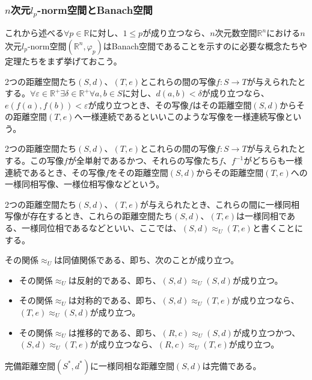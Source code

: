 \documentclass[dvipdfmx]{jsarticle}
\begin{document}
\subsubsection{$n$次元$l_{p}$-norm空間とBanach空間}%
これから述べる$\forall p \in \mathbb{R}$に対し、$1 \leq p$が成り立つなら、$n$次元数空間$\mathbb{R}^{n}$における$n$次元$l_{p}$-norm空間$\left( \mathbb{R}^{n},\varphi_{p} \right)$はBanach空間であることを示すのに必要な概念たちや定理たちをまず挙げておこう。
\begin{dfn}[一様連続写像]
2つの距離空間たち$(S,d)$、$(T,e)$とこれらの間の写像$f:S \rightarrow T$が与えられたとする。$\forall\varepsilon \in \mathbb{R}^{+}\exists\delta \in \mathbb{R}^{+}\forall a,b \in S$に対し、$d(a,b) < \delta$が成り立つなら、$e\left( f(a),f(b) \right) < \varepsilon$が成り立つとき、その写像$f$はその距離空間$(S,d)$からその距離空間$(T,e)$へ一様連続であるといいこのような写像を一様連続写像という。
\end{dfn}
\begin{dfn}[一様同相写像]
2つの距離空間たち$(S,d)$、$(T,e)$とこれらの間の写像$f:S \rightarrow T$が与えられたとする。この写像$f$が全単射であるかつ、それらの写像たち$f$、$f^{- 1}$がどちらも一様連続であるとき、その写像$f$をその距離空間$(S,d)$からその距離空間$(T,e)$への一様同相写像、一様位相写像などという。
\end{dfn}
\begin{dfn}[一様同相]
2つの距離空間たち$(S,d)$、$(T,e)$が与えられたとき、これらの間に一様同相写像が存在するとき、これらの距離空間たち$(S,d)$、$(T,e)$は一様同相である、一様同位相であるなどといい、ここでは、$(S,d) \approx_{U}(T,e)$と書くことにする。
\end{dfn}
\begin{thm}
その関係$\approx_{U}$は同値関係である、即ち、次のことが成り立つ。
\begin{itemize}
\item
  その関係$\approx_{U}$は反射的である、即ち、$(S,d) \approx_{U}(S,d)$が成り立つ。
\item
  その関係$\approx_{U}$は対称的である、即ち、$(S,d) \approx_{U}(T,e)$が成り立つなら、$(T,e) \approx_{U}(S,d)$が成り立つ。
\item
  その関係$\approx_{U}$は推移的である、即ち、$(R,c) \approx_{U}(S,d)$が成り立つかつ、$(S,d) \approx_{U}(T,e)$が成り立つなら、$(R,c) \approx_{U}(T,e)$が成り立つ。
\end{itemize}
\end{thm}
\begin{thm}
完備距離空間$\left( S^{*},d^{*} \right)$に一様同相な距離空間$(S,d)$は完備である。
\end{thm}\par
\end{document}
